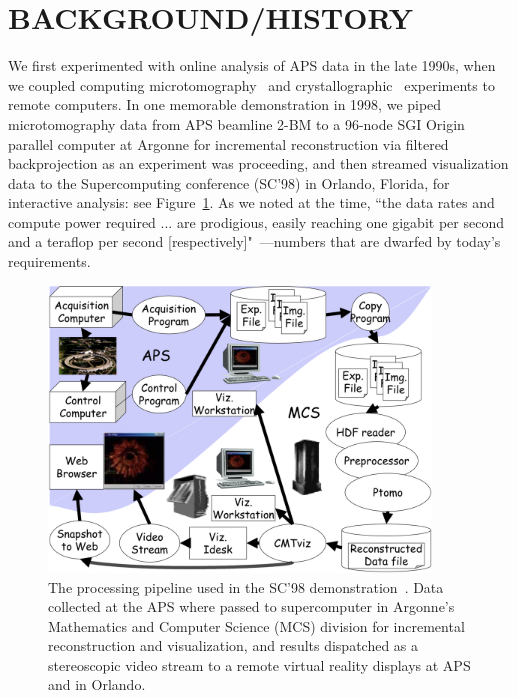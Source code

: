 \documentclass{aip-cp}
\newcommand\kyle[1]{}
\newcommand\kyle[1]{{\color{purple}[Kyle: #1]}}
\begin{document}
\kyle{References:networking materials data~\cite{foster2015networking}, Justin~\cite{wozniak2015big}, APS~\cite{toby2015practices}}


\section{BACKGROUND/HISTORY}

We first experimented with online analysis of APS data in the late 1990s, 
when we coupled 
computing microtomography~\cite{wang1999quasi,wang2001high} and crystallographic~\cite{von2000using}
experiments to remote computers.
In one memorable demonstration in 1998, we piped microtomography data from APS beamline 2-BM to a 
96-node SGI Origin parallel computer 
at Argonne for incremental reconstruction via filtered backprojection as an experiment was 
proceeding,
and then streamed visualization data to the Supercomputing conference (SC'98) in Orlando, Florida, 
for interactive analysis: see Figure~\ref{fig:sc98}. 
As we noted at the time, 
``the data rates and compute power required ... are prodigious, easily reaching one gigabit per 
second and a teraflop per second [respectively]"~\cite{von2000real}---numbers that are dwarfed by 
today's requirements. 

\begin{figure}[h]
  \centerline{\includegraphics[width=4in]{Figs/APS-Fig.png}}
  \caption{The processing pipeline used in the SC'98 demonstration~\cite{von2000real}. Data 
collected at the APS 
  where passed to supercomputer in Argonne's Mathematics and Computer Science (MCS) division for
  incremental reconstruction and visualization, and results dispatched as a stereoscopic
  video stream to a remote virtual reality displays at APS and in Orlando.\label{fig:sc98}}
\end{figure}
\end{document}
